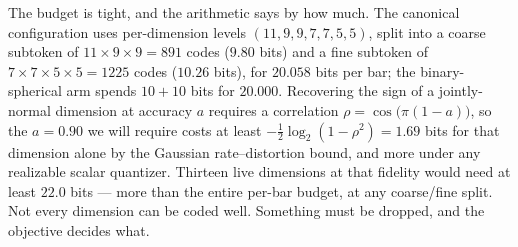 The budget is tight, and the arithmetic says by how much. The canonical configuration uses
per-dimension levels $(11,9,9,7,7,5,5)$, split into a coarse subtoken of $11 \times 9 \times 9 =
891$ codes ($9.80$ bits) and a fine subtoken of $7 \times 7 \times 5 \times 5 = 1225$ codes
($10.26$ bits), for $20.058$ bits per bar; the binary-spherical arm \citep{zhao2024bsq} spends
$10+10$ bits for $20.000$.
Recovering the sign of a jointly-normal dimension at accuracy $a$ requires a correlation
$\rho = \cos\bigl(\pi(1-a)\bigr)$, so the $a = 0.90$ we will require costs at least
$-\tfrac12\log_2(1-\rho^2) = 1.69$ bits for that dimension alone by the Gaussian rate--distortion
bound, and more under any realizable scalar quantizer. Thirteen live dimensions at that fidelity
would need at least $22.0$ bits --- more than the entire per-bar budget, at any coarse/fine split.
Not every dimension can be coded well. Something must be dropped, and the objective decides what.

